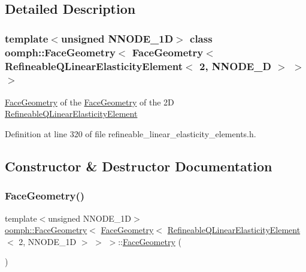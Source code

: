 \subsection{Detailed Description}
\subsubsection*{template$<$unsigned N\+N\+O\+D\+E\+\_\+1D$>$\newline
class oomph\+::\+Face\+Geometry$<$ Face\+Geometry$<$ Refineable\+Q\+Linear\+Elasticity\+Element$<$ 2, N\+N\+O\+D\+E\+\_\+D $>$ $>$ $>$}

\hyperlink{classoomph_1_1FaceGeometry}{Face\+Geometry} of the \hyperlink{classoomph_1_1FaceGeometry}{Face\+Geometry} of the 2D \hyperlink{classoomph_1_1RefineableQLinearElasticityElement}{Refineable\+Q\+Linear\+Elasticity\+Element} 

Definition at line 320 of file refineable\+\_\+linear\+\_\+elasticity\+\_\+elements.\+h.



\subsection{Constructor \& Destructor Documentation}
\mbox{\label{classoomph_1_1FaceGeometry_3_01FaceGeometry_3_01RefineableQLinearElasticityElement_3_012_00_01NNODE__1D_01_4_01_4_01_4_abf9bfda375869e8ba022101647f557d9}} 
\subsubsection{\texorpdfstring{Face\+Geometry()}{FaceGeometry()}}
{\footnotesize\ttfamily template$<$unsigned N\+N\+O\+D\+E\+\_\+1D$>$ \\
\hyperlink{classoomph_1_1FaceGeometry}{oomph\+::\+Face\+Geometry}$<$ \hyperlink{classoomph_1_1FaceGeometry}{Face\+Geometry}$<$ \hyperlink{classoomph_1_1RefineableQLinearElasticityElement}{Refineable\+Q\+Linear\+Elasticity\+Element}$<$ 2, N\+N\+O\+D\+E\+\_\+1D $>$ $>$ $>$\+::\hyperlink{classoomph_1_1FaceGeometry}{Face\+Geometry} (\begin{DoxyParamCaption}{ }\end{DoxyParamCaption})\hspace{0.3cm}{\ttfamily [inline]}}



